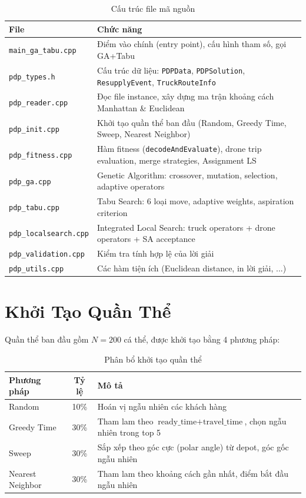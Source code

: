 \documentclass[12pt,a4paper]{article}
\begin{document}
\begin{table}[h!]
\centering
\caption{Cấu trúc file mã nguồn}
\begin{tabular}{lp{10cm}}
\toprule
\textbf{File} & \textbf{Chức năng} \\
\midrule
\texttt{main\_ga\_tabu.cpp} & Điểm vào chính (entry point), cấu hình tham số, gọi GA+Tabu \\
\texttt{pdp\_types.h} & Cấu trúc dữ liệu: \texttt{PDPData}, \texttt{PDPSolution}, \texttt{ResupplyEvent}, \texttt{TruckRouteInfo} \\
\texttt{pdp\_reader.cpp} & Đọc file instance, xây dựng ma trận khoảng cách Manhattan \& Euclidean \\
\texttt{pdp\_init.cpp} & Khởi tạo quần thể ban đầu (Random, Greedy Time, Sweep, Nearest Neighbor) \\
\texttt{pdp\_fitness.cpp} & Hàm fitness (\texttt{decodeAndEvaluate}), drone trip evaluation, merge strategies, Assignment LS \\
\texttt{pdp\_ga.cpp} & Genetic Algorithm: crossover, mutation, selection, adaptive operators \\
\texttt{pdp\_tabu.cpp} & Tabu Search: 6 loại move, adaptive weights, aspiration criterion \\
\texttt{pdp\_localsearch.cpp} & Integrated Local Search: truck operators + drone operators + SA acceptance \\
\texttt{pdp\_validation.cpp} & Kiểm tra tính hợp lệ của lời giải \\
\texttt{pdp\_utils.cpp} & Các hàm tiện ích (Euclidean distance, in lời giải, ...) \\
\bottomrule
\end{tabular}
\end{table}

\section{Khởi Tạo Quần Thể}

Quần thể ban đầu gồm $N = 200$ cá thể, được khởi tạo bằng 4 phương pháp:

\begin{table}[h!]
\centering
\caption{Phân bổ khởi tạo quần thể}
\begin{tabular}{lcp{8cm}}
\toprule
\textbf{Phương pháp} & \textbf{Tỷ lệ} & \textbf{Mô tả} \\
\midrule
Random & 10\% & Hoán vị ngẫu nhiên các khách hàng \\
Greedy Time & 30\% & Tham lam theo $\text{ready\_time} + \text{travel\_time}$, chọn ngẫu nhiên trong top 5 \\
Sweep & 30\% & Sắp xếp theo góc cực (polar angle) từ depot, góc gốc ngẫu nhiên \\
Nearest Neighbor & 30\% & Tham lam theo khoảng cách gần nhất, điểm bắt đầu ngẫu nhiên \\
\bottomrule
\end{tabular}
\end{table}
\end{document}
